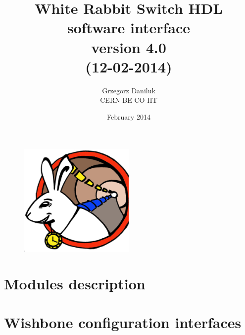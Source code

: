 \documentclass[a4paper, 12pt]{article}
\begin{document}
\title{White Rabbit Switch HDL\\ software interface\\\normalsize
{version 4.0}\\\small{(12-02-2014)}}
\author{Grzegorz Daniluk\\ CERN BE-CO-HT}

\date{February 2014}
\maketitle
\thispagestyle{empty}

\begin{figure}[ht!]
  \centering
  \vspace{1.3cm}
  \includegraphics[width=0.50\textwidth]{logo/WRlogo.ps}
  \label{fig:wr_logo}
\end{figure}

\newpage

\newpage

\newpage

\tableofcontents

\newpage



\section{Modules description}














\newpage
\section{Wishbone configuration interfaces}

\newpage

\newpage


\newpage

\newpage

\newpage

\newpage

\newpage

\newpage

\newpage

\newpage

\newpage

\newpage

\newpage

\end{document}
